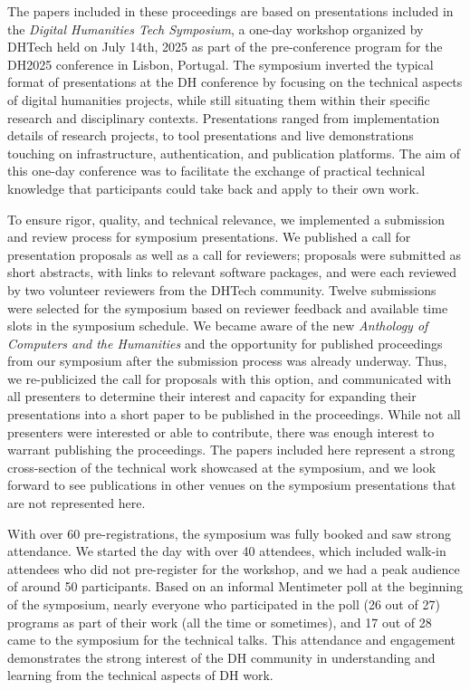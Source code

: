 \documentclass[final]{anthology-ch} %
\begin{document}
The papers included in these proceedings are based on presentations included in the \textit{Digital Humanities Tech Symposium}, a one-day workshop organized by DHTech held on July 14th, 2025 as part of the pre-conference program for the DH2025 conference in Lisbon, Portugal. The symposium inverted the typical format of presentations at the DH conference by focusing on the technical aspects of digital humanities projects, while still situating them within their specific research and disciplinary contexts. Presentations ranged from implementation details of research projects, to tool presentations and live demonstrations touching on infrastructure, authentication, and publication platforms. The aim of this one-day conference was to facilitate the exchange of practical technical knowledge that participants could take back and apply to their own work.

To ensure rigor, quality, and technical relevance, we implemented a submission and review process for symposium presentations.  We published a call for presentation proposals as well as a call for reviewers; proposals were submitted as short abstracts, with links to relevant software packages, and were each reviewed by two volunteer reviewers from the DHTech community. Twelve submissions were selected for the symposium based on reviewer feedback and available time slots in the symposium schedule.  We became aware of the new \textit{Anthology of Computers and the Humanities} and the opportunity for published proceedings from our symposium after the submission process was already underway. Thus, we re-publicized the call for proposals with this option, and communicated with all presenters to determine their interest and capacity for expanding their presentations into a short paper to be published in the proceedings. While not all presenters were interested or able to contribute, there was enough interest to warrant publishing the proceedings. The papers included here represent a strong cross-section of the technical work showcased at the symposium, and we look forward to see publications in other venues on the symposium presentations that are not represented here.

With over 60 pre-registrations, the symposium was fully booked and saw strong attendance. We started the day with over 40 attendees, which included walk-in attendees who did not pre-register for the workshop, and we had a peak audience of around 50 participants. Based on an informal Mentimeter poll at the beginning of the symposium, nearly everyone who participated in the poll (26 out of 27) programs as part of their work (all the time or sometimes), and 17 out of 28 came to the symposium for the technical talks. This attendance and engagement demonstrates the strong interest of the DH community in understanding and learning from the technical aspects of DH work.
\end{document}
